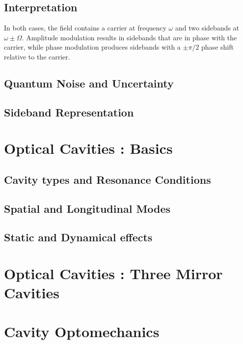 \subsection*{Interpretation}

In both cases, the field contains a carrier at frequency $\omega$ and two sidebands at $\omega \pm \Omega$. Amplitude modulation results in sidebands that are in phase with the carrier, while phase modulation produces sidebands with a $\pm \pi/2$ phase shift relative to the carrier.

\subsection{Quantum Noise and Uncertainty}
\subsection{Sideband Representation}
\hspace{1pt}

\section{Optical Cavities : Basics}
\subsection{Cavity types and Resonance Conditions}
\subsection{Spatial and Longitudinal Modes}
\subsection{Static and Dynamical effects}
\hspace{1pt}

\section{\texorpdfstring{\color{red}Optical Cavities : Three Mirror Cavities}{Optical Cavities : Three Mirror Cavities}}
\subsection{}
\hspace{1pt}

\section{Cavity Optomechanics}
